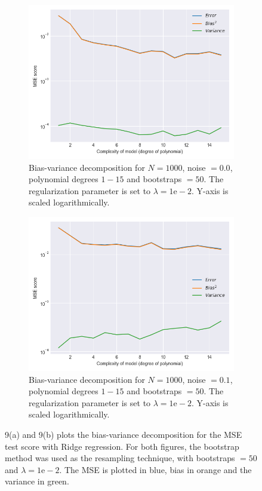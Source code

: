 \documentclass[a4paper,twocolumn]{article}
\begin{document}
\begin{figure}[ht]
    \centering
    \begin{subfigure}[b]{0.9\columnwidth}
        \includegraphics[width=\columnwidth]{bias_variance_tradeoff_Lambda=0.01_Bootstraps=50_N=1000_Noise=0.0_Degree=1-15.png}
        \caption{Bias-variance decomposition for $N = 1000$, noise $= 0.0$, polynomial degrees $1- 15$ and bootstraps $= 50$. The regularization parameter is set to $\lambda = 1\textrm{e}-2$. Y-axis is scaled logarithmically.}
    \end{subfigure}
    
    \begin{subfigure}[b]{0.9\columnwidth}
        \includegraphics[width=\columnwidth]{bias_variance_tradeoff_Lambda=0.01_Bootstraps=50_N=1000_Noise=0.1_Degree=1-15.png}
        \caption{Bias-variance decomposition for $N = 1000$, noise $= 0.1$, polynomial degrees $1- 15$ and bootstraps $= 50$. The regularization parameter is set to $\lambda = 1\textrm{e}-2$. Y-axis is scaled logarithmically.}
    \end{subfigure}
    \caption{9(a) and 9(b) plots the bias-variance decomposition for the MSE test score with Ridge regression. For both figures, the bootstrap method was used as the resampling technique, with bootstraps $= 50$ and $\lambda = 1\textrm{e}-2$. The MSE is plotted in blue, bias in orange and the variance in green. }
\end{figure}\\
\end{document}
